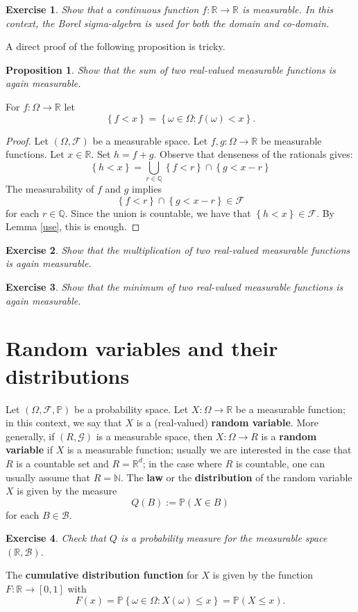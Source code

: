 \documentclass[12pt, reqno]{amsart}
\newtheorem{proposition}[theorem]{Proposition}
\newtheorem{ex}{Exercise}[section]
\newcommand\dff[1]{\textbf{#1}}
\newcommand\ns[1]{ \left\{ {#1} \right\} }
\renewcommand{\P}{{\mathbb P}}  %
\newcommand{\Q}{{\mathbb Q}}
\newcommand{\R}{{\mathbb R}}
\newcommand{\N}{{\mathbb N}}
\newcommand{\F}{{\mathcal F}}     %
\begin{document}
\begin{ex}
Show that a continuous function $f: \R \to \R$ is measurable.  In this context, the Borel sigma-algebra is used for both the domain and co-domain.  
\end{ex}

A direct proof of the following proposition is tricky.
\begin{proposition}
\label{sum}
Show that the sum of two real-valued measurable functions is again measurable.
\end{proposition}

For $f: \Omega \to \R$ let 
$$ \ns{ f <x } = \ns{ \omega \in \Omega:  f(\omega) <x}.$$

\begin{proof}
Let $(\Omega, \F)$ be a measurable space.  Let $f,g : \Omega \to \R$ be measurable functions.  Let $x \in \R$.  Set $h = f +g$.
Observe that  denseness of the rationals gives:
$$ \ns{ h< x} = \bigcup_{r \in \mathbb{Q}}  \ns{ f< r} \cap \ns{ g < x -r }$$
The measurability of $f$ and $g$ implies 
$$  \ns{ f< r} \cap \ns{ g < x -r } \in \F$$
for each $r \in \Q$.  Since the union is countable, we have that $\ns{ h< x} \in \F$.   By Lemma \ref{use}, this is enough.  
\end{proof}


\begin{ex}  Show that the multiplication of two real-valued measurable functions is again measurable.  

\end{ex}


\begin{ex}  Show that the minimum of two real-valued measurable functions is again measurable.  

\end{ex}



\section{Random variables and their distributions}


Let $(\Omega, \F, \P)$ be a probability space.  Let $X :\Omega \to \R$ be a measurable function; in this context, we say that $X$ is a  (real-valued)  \dff{random variable}.    More generally, if $(R, \mathcal{G})$ is a measurable space, then $X: \Omega \to R$ is a \dff{random variable} if $X$ is a measurable function; usually we are interested in the case that $R$ is a countable set and $R = \R^d$; in the case where $R$ is countable, one can usually assume that $R = \N$.   The \dff{law} or the  \dff{distribution} of the random variable $X$ is given by the measure 
$$ Q(B) :=  \P( X \in B)$$
for each $B \in \mathcal{B}$.  
\begin{ex}
\label{rvM}
Check that $Q$ is a probability measure for the measurable space $(\R, \mathcal{B})$.  
\end{ex}
The \dff{cumulative distribution function} for $X$ is given by the function $F: \R \to [0,1]$ with  
$$ F(x) = \P \ns{ \omega \in \Omega:  X(\omega) \leq x} = \P(X \leq x).$$
\end{document}
